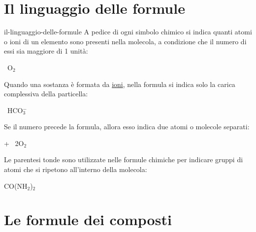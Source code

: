 \documentclass[preview]{standalone}
\begin{document}
\genpage

\section{Il linguaggio delle formule}

\begin{snippet}{il-linguaggio-delle-formule}
    A pedice di ogni simbolo chimico si indica quanti atomi o ioni di un elemento sono presenti
    nella molecola, a condizione che il numero di essi sia maggiore di 1 unità:
    \vspace{0.4cm}
    \begin{center}
        {\centering {} \textrightarrow\ O$_2$}
    \end{center}
    \vspace{0.4cm}
    Quando una sostanza è formata da \underline{ioni}, nella formula si indica solo la
    carica complessiva della particella:
    \vspace{0.4cm}
    \begin{center}
        {\centering
        \textrightarrow\ HCO$^-_3$
        }
    \end{center}
    \vspace{0.4cm}
    Se il numero precede la formula, allora esso indica due atomi o molecole separati:
    \vspace{0.4cm}
    \begin{center}
        {\centering {}
        } +\:
        {\centering {}
        }
        \textrightarrow\ 2O$_2$
    \end{center}
    \vspace{0.4cm}
    Le parentesi tonde sono utilizzate nelle formule chimiche per indicare gruppi di atomi
    che si ripetono all'interno della molecola:
    \vspace{0.4cm}
    \begin{center}
        {\centering CO(NH$_2$)$_2$
        }
    \end{center}
\end{snippet}

\section{Le formule dei composti}
\end{document}

